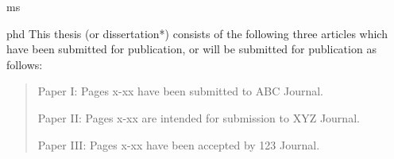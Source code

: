 \documentclass[times,12pt,titlepage]{mstthesis}
\begin{document}

\begin{ThesisTitlePage}{ms}

\author{\MakeUppercase{Full Legal Name}}







\end{ThesisTitlePage}




\begin{ThesisPublicationOption}{phd}
  This thesis (or dissertation*) consists of the following three
  articles which have been submitted for publication, or will be
  submitted for publication as follows:
\begin{quote}\begin{description}
\item Paper I: Pages x-xx have been submitted to ABC Journal.
\item Paper II: Pages x-xx are intended for submission to XYZ Journal.
\item Paper III: Pages x-xx have been accepted by 123 Journal.
\end{description}\end{quote}

\end{ThesisPublicationOption}


\begin{ThesisAbstract}
\lipsum[1]
\end{ThesisAbstract}

\end{document}
